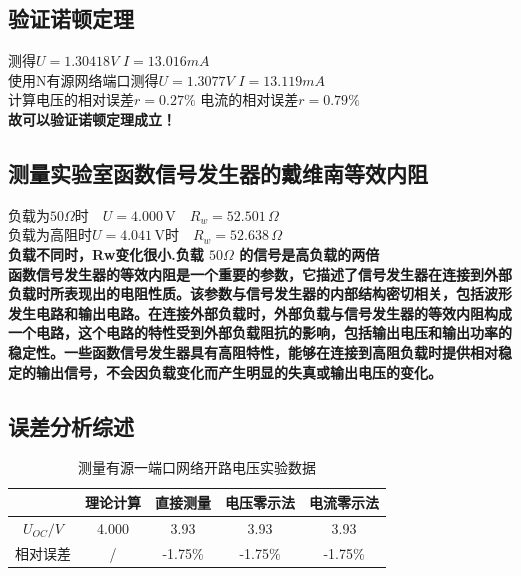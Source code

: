 \documentclass[dvipsnames, svgnames,a4paper,11pt]{article}
\begin{document}
	\subsection{验证诺顿定理}
	\indent 测得$U=1.30418V$   $ I=13.016mA$\\
	\indent 使用N有源网络端口测得$U=1.3077V$   $ I=13.119mA$\\
	\indent 计算电压的相对误差$r=0.27\%$ 电流的相对误差$r=0.79\%$\\
	\indent \textbf{\Large{故可以验证诺顿定理成立！}}
	\subsection{测量实验室函数信号发生器的戴维南等效内阻}
	\indent 负载为$50\Omega 时\quad U = 4.000\, \text{V} \quad R_w = 52.501\, \Omega $\\
 \indent 负载为高阻时$ U = 4.041\, \text{V} 时\quad R_w = 52.638\, \Omega$\\
 \indent \textbf{负载不同时，Rw变化很小.负载 $50\Omega$ 的信号是高负载的两倍}\\
 \indent \textbf{函数信号发生器的等效内阻是一个重要的参数，它描述了信号发生器在连接到外部负载时所表现出的电阻性质。该参数与信号发生器的内部结构密切相关，包括波形发生电路和输出电路。在连接外部负载时，外部负载与信号发生器的等效内阻构成一个电路，这个电路的特性受到外部负载阻抗的影响，包括输出电压和输出功率的稳定性。一些函数信号发生器具有高阻特性，能够在连接到高阻负载时提供相对稳定的输出信号，不会因负载变化而产生明显的失真或输出电压的变化。}

\subsection{误差分析综述}
\begin{table}[htbp]
	\centering
	\begin{tabular}{|c|c|c|c|c|}
		\hline
		& 理论计算 & 直接测量   & 电压零示法 & 电流零示法 \\
		\hline
		$U_{OC}/V$ & 4.000    & 3.93 & 3.93 & 3.93 \\
		\hline
		相对误差  &    /  & -1.75\% & -1.75\%&-1.75\% \\
		\hline
	\end{tabular}
	\caption{测量有源一端口网络开路电压实验数据}
\end{table}
\end{document}
